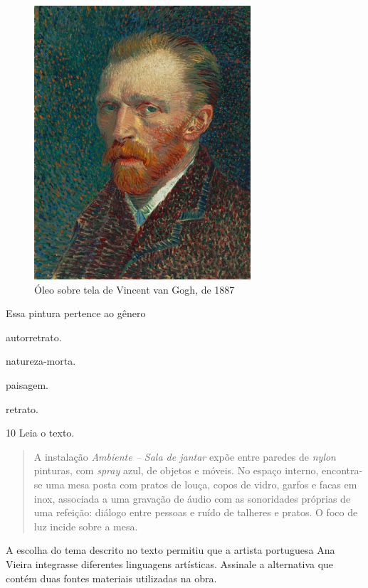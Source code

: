 \begin{figure}[htpb!]
\includegraphics[width=3.16667in,height=4.01042in]{media/image28.png}
\caption{Óleo sobre tela de Vincent van Gogh, de 1887}
\end{figure}



Essa pintura pertence ao gênero

\begin{escolha}
\item
  autorretrato.
\item
  natureza-morta.
\item
  paisagem.
\item
  retrato.
\end{escolha}


\pagebreak
\num{10} Leia o texto.

\begin{quote}
A instalação \emph{Ambiente -- Sala de jantar} expõe entre paredes de
\textit{nylon} pinturas, com \textit{spray} azul, de objetos e móveis. No espaço interno,
encontra-se uma mesa posta com pratos de louça, copos de vidro, garfos e
facas em inox, associada a uma gravação de áudio com as sonoridades
próprias de uma refeição: diálogo entre pessoas e ruído de talheres e
pratos. O foco de luz incide sobre a mesa.

\end{quote}

A escolha do tema descrito no texto permitiu que a
artista portuguesa Ana Vieira integrasse diferentes linguagens
artísticas. Assinale a alternativa que contém duas fontes materiais
utilizadas na obra.

